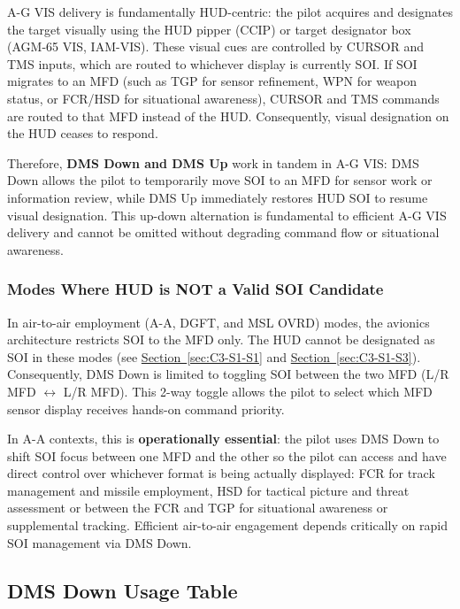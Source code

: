 \documentclass[11pt, a4paper, twoside]{report}
\newcommand{\secref}[1]{\hyperref[#1]{Section~\ref*{#1}}}
\begin{document}
A-G VIS delivery is fundamentally HUD-centric: the pilot acquires and designates the target visually using the HUD pipper (CCIP) or target designator box (AGM-65 VIS, IAM-VIS). These visual cues are controlled by CURSOR and TMS inputs, which are routed to whichever display is currently SOI. If SOI migrates to an MFD (such as TGP for sensor refinement, WPN for weapon 
status, or FCR/HSD for situational awareness), CURSOR and TMS commands are routed to that MFD instead of the HUD. Consequently, visual designation on the HUD ceases to respond.

Therefore, \textbf{DMS Down and DMS Up} work in tandem in A-G VIS: DMS Down allows the pilot to temporarily move SOI to an MFD for sensor work or information review, while DMS Up immediately restores HUD SOI to resume visual designation. This up-down alternation is fundamental to efficient A-G VIS delivery and cannot be omitted without degrading command flow or situational awareness.

\subsubsection{Modes Where HUD is NOT a Valid SOI Candidate}
\label{sec:C3-S3-S1-S2}

In air-to-air employment (A-A, DGFT, and MSL OVRD) modes, the avionics architecture restricts SOI to the MFD only. The HUD cannot be designated as SOI 
in these modes (see \secref{sec:C3-S1-S1} and \secref{sec:C3-S1-S3}). Consequently, DMS Down is limited to toggling SOI between the two MFD (L/R MFD $\leftrightarrow$ L/R MFD). This 2-way toggle allows the pilot to select which MFD sensor display receives hands-on command priority.

In A-A contexts, this is \textbf{operationally essential}: the pilot uses DMS Down to shift SOI focus between one MFD and the other so the pilot can access and have direct control over whichever format is being actually displayed: FCR for track management and missile employment, HSD for tactical picture and threat assessment or between the FCR and TGP for situational awareness or supplemental tracking. Efficient air-to-air engagement depends critically on rapid SOI management via DMS Down.

\subsection{DMS Down Usage Table}
\label{sec:C3-S3-S2}
\end{document}
